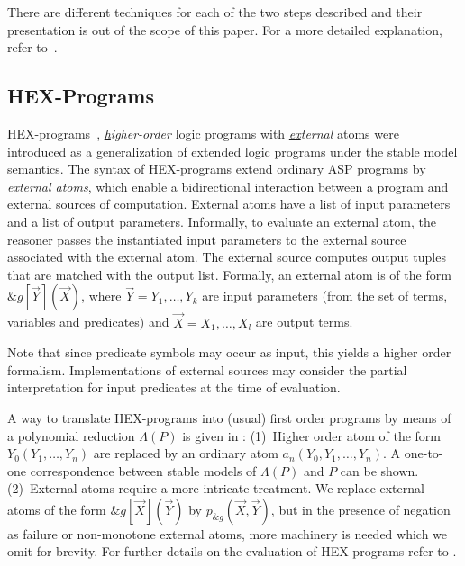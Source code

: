 There are different techniques for each of the two steps described and their presentation is out of the scope of this paper. For a more detailed explanation, refer to~\cite{}.

\subsection{HEX-Programs}
HEX-programs~\cite{hex}, \emph{\underline{h}igher-order} logic programs with \emph{\underline{ex}ternal} atoms were introduced as a generalization of extended logic programs under the stable model semantics. The syntax of HEX-programs extend ordinary ASP programs by \emph{external atoms}, which enable a bidirectional interaction between a program and external sources of computation. External atoms have a list of input parameters and a list of output parameters. Informally, to evaluate an external atom, the reasoner passes the instantiated input parameters to the external source associated with the external atom. The external source computes output tuples that are matched with the output list. Formally, an external atom is of the form \(\&g[\vec{Y}](\vec{X})\), where \(\vec{Y} = Y_1, \dotso , Y_k\) are input parameters (from the set of terms, variables and predicates) and \(\vec{X} = X_1, \dotso , X_l \) are output terms.

Note that since predicate symbols may occur as input, this yields a higher order formalism. Implementations of external sources may consider the partial interpretation for input predicates at the time of evaluation.

A way to translate HEX-programs into (usual) first order programs by means of a polynomial reduction \(\Lambda(P)\) is given in \cite{hex}: (1)~Higher order atom of the form \(Y_0(Y_1, \dotso, Y_n)\) are replaced by an ordinary atom \(a_n(Y_0, Y_1, \dotso, Y_n)\). A one-to-one correspondence between stable models of \(\Lambda(P)\) and \(P\) can be shown. (2)~External atoms require a more intricate treatment. We replace external atoms of the form \(\&g[\vec{X}](\vec{Y})\) by \(p_{\&g}(\vec{X},\vec{Y})\), but in the presence of negation as failure or non-monotone external atoms, more machinery is needed which we omit for brevity. For further details on the evaluation of HEX-programs refer to \cite{effeval1,effeval2}.